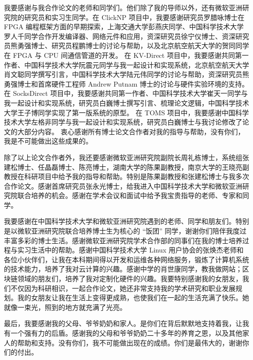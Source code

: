\begin{acknowledgements}
我要感谢与我合作论文的老师和同学们。他们除了我的导师以外，还有微软亚洲研究院的研究员和实习生同学。在 ClickNP 项目中，我要感谢研究员罗腊咏博士在 FPGA 编程框架方面的早期探索，上海交通大学彭燕庆同学、中国科学技术大学罗人千同学合作开发编译器、网络元件和应用，资深研究员徐宁仪博士、资深研究员熊勇强博士、研究员程鹏博士的讨论与帮助，以及北京航空航天大学的贺同同学在 FPGA 与 CPU 间通信管道的开发。
在 KV-Direct 项目中，我要感谢共同第一作者、中国科学技术大学阮震元同学与我一起设计和实现系统，北京航空航天大学肖文聪同学撰写引言，中国科学技术大学陆元伟同学的讨论与帮助，资深研究员熊勇强博士和首席硬件工程师 Andrew Putnam 博士的讨论与硬件实验环境的支持。
在 SocksDirect 项目中，我要感谢共同第一作者、中国科学技术大学崔天一同学与我一起设计和实现系统，研究员白巍博士撰写引言、梳理论文逻辑，中国科学技术大学王子博同学实现了第一版系统的原型。
在 TOMS 项目中，我要感谢中国科学技术大学左格非同学与我一起设计和实现系统，研究员白巍博士与我讨论修改了论文的大部分内容。
衷心感谢所有博士论文合作者对我的指导与帮助，没有你们，我是不可能做出这些成果的。

除了以上论文合作者外，我还要感谢微软亚洲研究院副院长周礼栋博士，系统组张建松博士、任晶磊博士、陈亮博士，湖南⼤学的陈果副教授，南京⼤学的王晓亮副教授在科研项⽬中给予我的指导和帮助。特别是陈果副教授和张建松博士与我多次合作论文。感谢首席研究员张永光博士，给我进入中国科学技术⼤学和微软亚洲研究院联合培养的机会。感谢在学术会议和面试中给予我宝贵指导的老师、专家和同学。

我要感谢在中国科学技术⼤学和微软亚洲研究院遇到的⽼师、同学和朋友们。特别是以微软亚洲研究院联合培养博士生为核心的 ``饭团'' 同学，谢谢你们陪伴我度过丰富多彩的博士生活。感谢微软亚洲研究院学术合作部的同事们在我的博士培养过程与实习生活中的帮助。感谢中国科学技术大学 Linux 用户协会的张焕杰老师和各位小伙伴们，让我在本科期间得以开发和运维各种网络服务，锻炼了计算机系统的技术能力，培养了我对云计算的兴趣。感谢中学的肖世康同学，教我做网站；区块链领域的朋友们，培养了我对定制化硬件的兴趣。我要特别感谢我的女朋友，我们不仅因为科研相识，一起合作论文，她还非常支持我的学术研究和职业发展规划。我的女朋友让我在生活上变得更成熟，也使我们在一起的生活充满了快乐。她就像一束光，照到的地方就充满了光亮。

最后，我要感谢我的⽗母、爷爷奶奶和家⼈。是你们在背后默默地⽀持着我，让我有⼀个强有⼒的后盾。感谢我的⽗母和爷爷奶奶⼆⼗多年的养育之恩，以及其他家⼈的帮助和⽀持。没有你们，我不可能做出现在的成绩。你们是最伟⼤的，谢谢你们的付出。
\end{acknowledgements}
